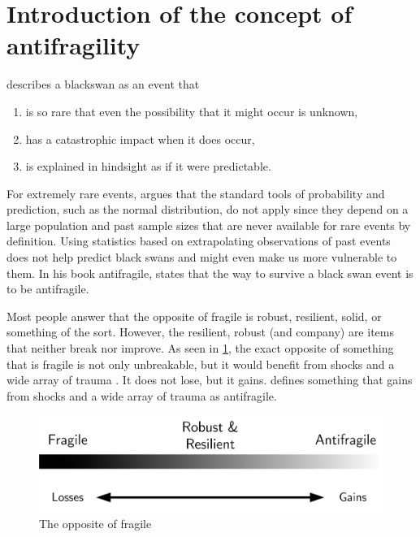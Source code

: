 \section{Introduction of the concept of antifragility}
\label{sec:introantifragility}
\textcite{Taleb2008} describes a \gls{blackswan} as an event that
\begin{enumerate}
	\item{is so rare that even the possibility that it might occur is unknown,}
	\item{has a catastrophic impact when it does occur,}
	\item{is explained in hindsight as if it were predictable.}
\end{enumerate}
For extremely rare events, \textcite{Taleb2008} argues that the standard tools of probability and prediction, such as the normal distribution, do not apply since they depend on a large population and past sample sizes that are never available for rare events by definition. Using statistics based on extrapolating observations of past events does not help predict black swans and might even make us more vulnerable to them. In his book \Gls{antifragile}, \textcite{Taleb2012} states that the way to survive a black swan event is to be \gls{antifragile}.

Most people answer that the opposite of \gls{fragile} is \gls{robust}, \gls{resilient}, solid, or something of the sort. However, the \gls{resilient}, \gls{robust} (and company) are items that neither break nor improve. As seen in \cref{fig:antifragilesimple}, the exact opposite of something that is \gls{fragile} is not only unbreakable, but it would benefit from shocks and a wide array of trauma \parencite{Taleb2012}. It does not lose, but it gains. \textcite{Taleb2012} defines something that gains from shocks and a wide array of trauma as \gls{antifragile}. 
\begin{figure}[H]
	\centering
	\includegraphics[width=0.6\linewidth]{images/antifragilesimple}
	\caption[The opposite of fragile]{The opposite of fragile}
	\label{fig:antifragilesimple}
\end{figure}
